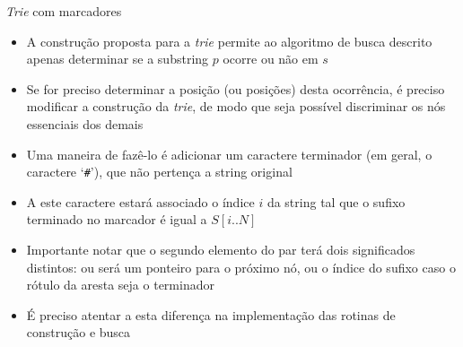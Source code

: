 \begin{frame}[fragile]{{\it Trie} com marcadores}

    \begin{itemize}
        \item A construção proposta para a \textit{trie} permite ao algoritmo de busca descrito 
            apenas determinar se a substring $p$ ocorre ou não em $s$
        \pause

        \item Se for preciso determinar a posição (ou posições) desta ocorrência, é preciso 
            modificar a construção da \textit{trie}, de modo que seja possível discriminar os nós 
                essenciais dos demais
        \pause

        \item Uma maneira de fazê-lo é adicionar um caractere terminador (em geral, o caractere
            `\texttt{\#}'), que não pertença a string original
        \pause

        \item A este caractere estará associado o índice $i$ da string tal que o sufixo terminado 
            no marcador é igual a $S[i..N]$
        \pause

        \item Importante notar que o segundo elemento do par terá dois significados distintos: ou
            será um ponteiro para o próximo nó, ou o índice do sufixo caso o rótulo da aresta
            seja o terminador
        \pause

        \item É preciso atentar a esta diferença na implementação das rotinas de construção e
            busca
    \end{itemize}

\end{frame}

